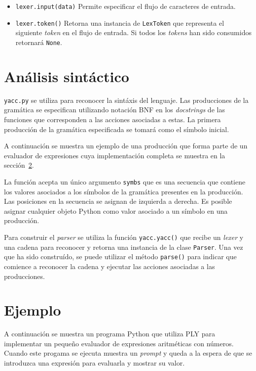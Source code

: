 \documentclass{article}
\begin{document}
\begin{itemize} 
  \item \texttt{lexer.input(data)} Permite especificar el flujo de caracteres
  	de entrada.
  \item \texttt{lexer.token()} Retorna una instancia de \texttt{LexToken} que
  	representa el siguiente \textit{token} en el flujo de entrada. Si todos los
  	\textit{tokens} han sido consumidos retornará \texttt{None}.
\end{itemize}

\section{Análisis sintáctico}

\texttt{yacc.py} se utiliza para reconocer la sintáxis del lenguaje. Las
producciones de la gramática se especifican utilizando notación BNF en los
\textit{docstrings} de las funciones que corresponden a las acciones asociadas
a estas. La primera producción de la gramática especificada se tomará como el
símbolo inicial.

A continuación se muestra un ejemplo de una producción que forma parte
de un evaluador de expresiones cuya implementación completa se muestra en la
sección~\ref{sec:ejemplo}.

\begin{quote}

\end{quote}

La función acepta un único argumento \texttt{symbs} que es una secuencia
que contiene los valores asociados a los símbolos de la gramática presentes en
la producción. Las posiciones en la secuencia se asignan de izquierda a
derecha. Es posible asignar cualquier objeto Python como valor asociado a un
símbolo en una producción.

Para construir el \textit{parser} se utiliza la función \texttt{yacc.yacc()}
que recibe un \textit{lexer} y una cadena para reconocer y retorna una instancia
de la clase \texttt{Parser}. Una vez que ha sido construído, se puede utilizar
el método \texttt{parse()} para indicar que comience a reconocer la cadena y
ejecutar las acciones asociadas a las producciones.

\section{Ejemplo}
\label{sec:ejemplo}

A continuación se muestra un programa Python que utiliza PLY para implementar
un pequeño evaluador de expresiones aritméticas con números. Cuando este
progama se ejecuta muestra un \textit{prompt} y queda a la espera de que se
introduzca una expresión para evaluarla y mostrar su valor.

\begin{quote}

\end{quote}
\end{document}
